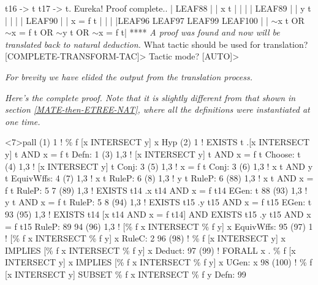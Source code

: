 \begin{tpsexample}
t16   ->   t
t17   ->   t.
Eureka!  Proof complete..
|                 LEAF88                 |
|                  x t                   |
|                                        |
|                 LEAF89                 |
|                  y t                   |
|                                        |
|                LEAF90                  |
|                x = f t                 |
|                                        |
|LEAF96     LEAF97     LEAF99    LEAF100 |
| \(\sim\)x t  OR \(\sim\)x = f t OR  \(\sim\)y t  OR \(\sim\)x = f t|
****
{\it A proof was found and now will be translated back to natural deduction.}
What tactic should be used for translation? [COMPLETE-TRANSFORM-TAC]>
Tactic mode? [AUTO]>

{\it For brevity we have elided the output from the translation process.}

\end{tpsexample}

{\it Here's the complete proof. Note that it is slightly different from
that shown in section \ref{MATE-then-ETREE-NAT}, where all the
definitions were instantiated at one time.}

\begin{tpsexample}

<7>pall
(1)   1      !  \% f [x INTERSECT y] x                                        Hyp
(2)   1      !  EXISTS t .[x INTERSECT y] t AND x = f t                  Defn: 1
(3)   1,3    !  [x INTERSECT y] t AND x = f t                          Choose: t
(4)   1,3    !  [x INTERSECT y] t                                        Conj: 3
(5)   1,3    !  x = f t                                                  Conj: 3
(6)   1,3    !  x t AND y t                                         EquivWffs: 4
(7)   1,3    !  x t                                                     RuleP: 6
(8)   1,3    !  y t                                                     RuleP: 6
(88)  1,3    !  x t AND x = f t                                       RuleP: 5 7
(89)  1,3    !  EXISTS t14 .x t14 AND x = f t14                       EGen: t 88
(93)  1,3    !  y t AND x = f t                                       RuleP: 5 8
(94)  1,3    !  EXISTS t15 .y t15 AND x = f t15                       EGen: t 93
(95)  1,3    !      EXISTS t14 [x t14 AND x = f t14]
                 AND EXISTS t15 .y t15 AND x = f t15                RuleP: 89 94
(96)  1,3    !  [\% f x INTERSECT \% f y] x                          EquivWffs: 95
(97)  1      !  [\% f x INTERSECT \% f y] x                            RuleC: 2 96
(98)         !  \% f [x INTERSECT y] x IMPLIES [\% f x INTERSECT \% f y] x
                                                                      Deduct: 97
(99)         !  FORALL x .        \% f [x INTERSECT y] x
                           IMPLIES [\% f x INTERSECT \% f y] x          UGen: x 98
(100)        !  \% f [x INTERSECT y] SUBSET \% f x INTERSECT \% f y        Defn: 99

\end{tpsexample}


